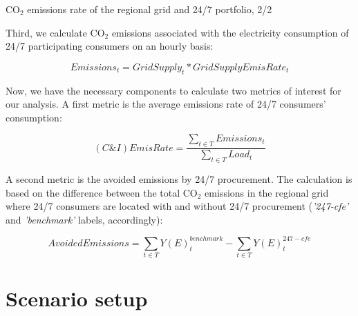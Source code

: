 \begin{frame}{CO$_2$ emissions rate of the regional grid and 24/7 portfolio, 2/2}

  {\small
  Third, we calculate {CO$_2$ emissions} associated with the electricity consumption of 
  24/7 participating consumers on an hourly basis:
  
  \begin{equation*}
  Emissions_t = GridSupply_t * GridSupplyEmisRate_t
  \end{equation*}

  Now, we have the necessary components to calculate two metrics of interest for our analysis. 
  A first metric is the \alert{average emissions rate of 24/7 consumers' consumption}:

  \begin{equation*}
    (C\&I)EmisRate = \frac{\sum_{t\in T} Emissions_t}{\sum_{t\in T} Load_t}
  \end{equation*}

  A second metric is the \alert{avoided emissions} by 24/7 procurement. The calculation is based on the 
  difference between the total {CO$_2$ emissions} in the regional grid where 24/7 consumers are located
  with and without 24/7 procurement (\emph{'247-cfe'} and \emph{'benchmark'} labels, accordingly):

  \begin{equation*}
    AvoidedEmissions = \sum_{t\in T} Y(E)_t^{benchmark} - \sum_{t\in T} Y(E)_t^{247-cfe}
  \end{equation*}
  }

\end{frame}


\section{Scenario setup}


